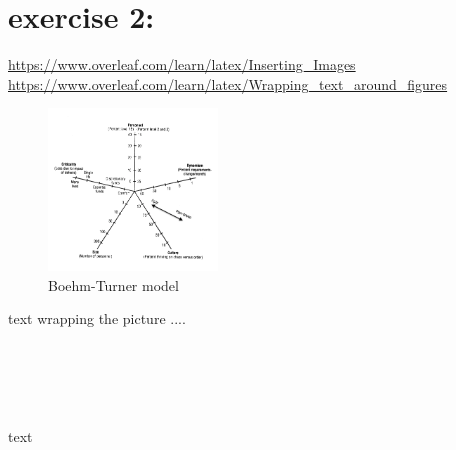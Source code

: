 \section{exercise 2:}
\url{https://www.overleaf.com/learn/latex/Inserting_Images}
\\
\url{https://www.overleaf.com/learn/latex/Wrapping_text_around_figures}
\\
\begin{figure}
	\vspace{-20pt}
	\includegraphics[width=0.4\textwidth]{boehmturner}
	\caption{Boehm-Turner model}
\end{figure}
text wrapping the picture ....
\\
\\
\\
\\
\\
\\
text \cite{lamport94}
\\
\\
\\
\\
